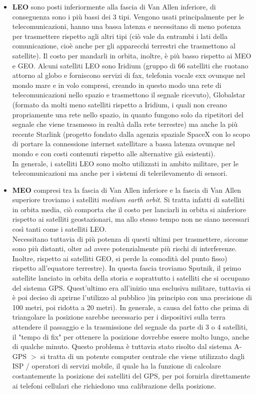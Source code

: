 \documentclass{article}
\begin{document}
\begin{itemize}

\item \textbf{LEO} sono posti inferiormente alla fascia di Van Allen inferiore,
di conseguenza sono i più bassi dei 3 tipi. Vengono usati principalmente per le
telecomunicazioni, hanno una bassa latenza e necessitano di meno potenza per
trasmettere rispetto agli altri tipi (ciò vale da entrambi i lati della
comunicazione, cioè anche per gli apparecchi terrestri che trasmettono al
satellite). Il costo per mandarli in orbita, inoltre, è più basso rispetto ai MEO
e GEO. Alcuni satelliti LEO sono Iridium (gruppo di 66 satelliti che ruotano
attorno al globo e forniscono servizi di fax, telefonia vocale exx ovunque nel
mondo mare e in volo compresi, creando in questo modo una rete di
telecomunicazioni nello spazio e trasmettono il segnale ricevuto), Globalstar
(formato da molti meno satelliti rispetto a Iridium, i quali non creano
propriamente una rete nello spazio, in quanto fungono solo da ripetitori del
segnale che viene trasmesso in realtà dalla rete terrestre) ma anche la più
recente Starlink (progetto fondato dalla agenzia spaziale SpaceX con lo scopo di
portare la connessione internet satellitare a bassa latenza ovunque nel mondo e
con costi contenuti rispetto alle alternative già esistenti). \\
In generale, i satelliti LEO sono molto utilizzati in ambito militare, per le
telecomunicazioni ma anche per i sistemi di telerilevamento di sensori. 

\item \textbf{MEO} compresi tra la fascia di Van Allen inferiore e la fascia di
Van Allen superiore troviamo i satelliti \textit{medium earth orbit}. Si tratta
infatti di satelliti in orbita media, ciò comporta che il costo per lanciarli in
orbita si ainferiore rispetto ai satelliti geostazionari, ma allo stesso tempo
non ne siano necessari così tanti come i satelliti LEO. \\
Necessitano tuttavia di più potenza di questi ultimi per trasmettere, siccome
sono più distanti, olter ad avere potenzialmente più rischi di interferenze.
Inoltre, rispetto ai satelliti GEO, si perde la comodità del punto fisso)
rispetto all'equatore terrestre). In questa fascia troviamo Sputnik, il primo
satellite lanciato in orbita della storia e soprattutto i satelliti che si
occupano del sistema GPS. Quest'ultimo era all'inizio una esclusiva militare,
tuttavia si è poi deciso di aprirne l'utilizzo al pubblico )in principio con una
precisione di 100 metri, poi ridotta a 20 metri). In generale, a causa del fatto
che prima di triangolare la posizione sarebbe necessario per i dispositivi sulla
terra attendere il passaggio e la trasmissione del segnale da parte di 3 o 4
satelliti, il "tempo di fix" per ottenere la posizione dovrebbe essere molto
lungo, anche di qualche minuto. Questo problema è tuttavia stato risolto dal
sistema A-GPS $>$ si tratta di un potente computer centrale che viene utilizzato
dagli ISP / operatori di servizi mobile, il quale ha la funzione di calcolare
costantemente la posizione dei satelliti del GPS, per poi fornirla direttamente
ai telefoni cellulari che richiedono una calibrazione della posizione. \\


\end{itemize}
\end{document}
